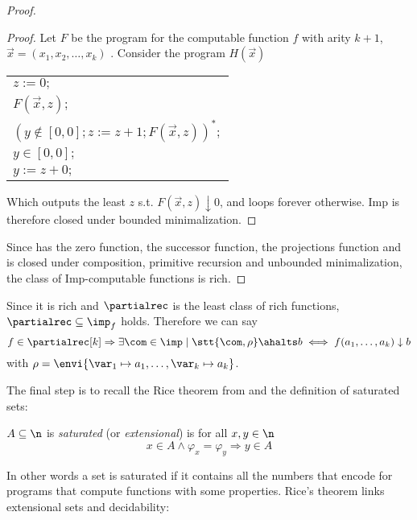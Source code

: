 \begin{proof}
  \begin{proof}
    Let \(F\) be the program for the computable function \(f\)
    with arity \(k+1\), \(\vec{x} = (x_1, x_2, \dots, x_k)\)
    . Consider the program \(H(\vec{x})\)
    \begin{center}
      \begin{tabular}{l}
        \(z := 0;\)\\[0pt]
        \(F(\vec{x},z);\)\\[0pt]
        \((y \not\in [0,0];z := z + 1;F(\vec{x},z))^*;\)\\[0pt]
        \(y\in [0,0];\)\\[0pt]
        \(y := z + 0;\)\\[0pt]
      \end{tabular}

    \end{center}
    Which outputs the least \(z\) s.t. \(F(\vec{x},z) \downarrow 0\),
    and loops forever otherwise. Imp is therefore closed under bounded
    minimalization.
  \end{proof}
  Since has the zero function, the successor function, the projections
  function and is closed under composition, primitive recursion and
  unbounded minimalization, the class of Imp-computable functions is
  rich.
\end{proof}

Since it is rich and \(\partialrec\) is the least class of rich
functions, \(\partialrec \subseteq \imp_f\) holds. Therefore we can
say \[f \in \partialrec[k] \Rightarrow \exists \com \in \imp \mid
\stt{\com, \rho}\ahalts b \iff f(a_1, \dots, a_k) \downarrow b\]
with \(\rho = \envi{\var_1 \mapsto a_1, \dots, \var_k \mapsto a_k}\).

The final step is to recall the Rice theorem from
\cite{rice1953classes} and the definition of saturated sets:

\begin{definition}
  \(A \subseteq \n\) is \emph{saturated} (or \emph{extensional}) is
  for all \(x,y\in\n\)
  \begin{equation*}
    x \in A \wedge \varphi_x = \varphi_y \Rightarrow y \in A
  \end{equation*}
\end{definition}

In other words a set is saturated if it contains all the numbers that
encode for programs that compute functions with some
properties. Rice's theorem links extensional sets and decidability:

